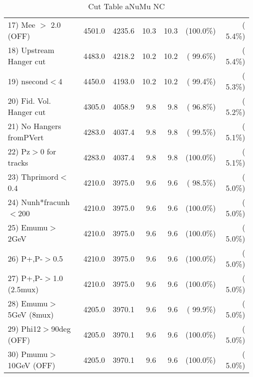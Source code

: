 \begin{table}[h!]
\begin{tabular}{||l||r|r|r|r|r|r||}
 17) Mee $>$ 2.0  (OFF)   &       4501.0 &       4235.6 &         10.3 &         10.3 & (100.0\%) & (  5.4\%) \\
 18) Upstream Hanger cut  &       4483.0 &       4218.2 &         10.2 &         10.2 & ( 99.6\%) & (  5.4\%) \\
 19) nsecond$<$4          &       4450.0 &       4193.0 &         10.2 &         10.2 & ( 99.4\%) & (  5.3\%) \\
 20) Fid. Vol. Hanger cut &       4305.0 &       4058.9 &          9.8 &          9.8 & ( 96.8\%) & (  5.2\%) \\
 21) No Hangers fromPVert &       4283.0 &       4037.4 &          9.8 &          9.8 & ( 99.5\%) & (  5.1\%) \\
 22) Pz$>$0 for tracks    &       4283.0 &       4037.4 &          9.8 &          9.8 & (100.0\%) & (  5.1\%) \\
 23) Thprimord$<$0.4      &       4210.0 &       3975.0 &          9.6 &          9.6 & ( 98.5\%) & (  5.0\%) \\
 24) Nunh*fracunh$<$200   &       4210.0 &       3975.0 &          9.6 &          9.6 & (100.0\%) & (  5.0\%) \\
 25) Emumu$>$2GeV         &       4210.0 &       3975.0 &          9.6 &          9.6 & (100.0\%) & (  5.0\%) \\
 26) P+,P-$>$0.5          &       4210.0 &       3975.0 &          9.6 &          9.6 & (100.0\%) & (  5.0\%) \\
 27) P+,P-$>$1.0 (2.5mux) &       4210.0 &       3975.0 &          9.6 &          9.6 & (100.0\%) & (  5.0\%) \\
 28) Emumu$>$5GeV  (8mux) &       4205.0 &       3970.1 &          9.6 &          9.6 & ( 99.9\%) & (  5.0\%) \\
 29) Phi12$>$90deg  (OFF) &       4205.0 &       3970.1 &          9.6 &          9.6 & (100.0\%) & (  5.0\%) \\
 30) Pmumu$>$10GeV  (OFF) &       4205.0 &       3970.1 &          9.6 &          9.6 & (100.0\%) & (  5.0\%) \\
 \hline
 \hline
 \end{tabular}
 \caption{Cut Table  aNuMu NC }
 \label{tab-cutCohPi-}
 \end{table}
